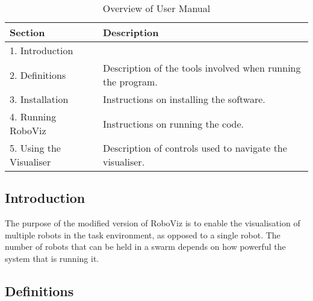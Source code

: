 




\begin{table}[h!]
    \centering
    \caption{Overview of User Manual}
    \begin{tabular}[t]{|p{8cm}|p{7cm}|} \hline
        \textbf{Section} & \textbf{Description} \\
        \hline 1. Introduction
                         & \\
        \hline 2. Definitions
                            & Description of the tools involved when running the program. \\
        \hline 3. Installation 
                            & Instructions on installing the software. \\ 
        \hline 4.  Running RoboViz
                            & Instructions on running the code. \\
        \hline 5.  Using the Visualiser
                            & Description of controls used to navigate the visualiser. \\
        \hline
    \end{tabular}
    \label{tab:T}
\end{table}

\subsection{Introduction}
\label{s:introduction}

The purpose of the modified version of RoboViz is to enable the visualisation of multiple robots in the task environment, as opposed to
a single robot. The number of robots that can be held in a swarm depends on how powerful the system that is running it.



\subsection{Definitions}
\label{s:definitions}

